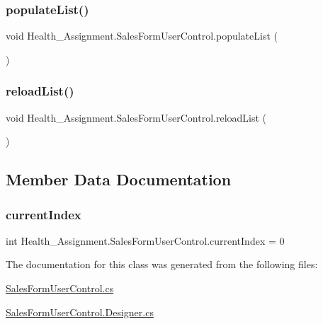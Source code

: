 \subsubsection{\texorpdfstring{populate\+List()}{populateList()}}
{\footnotesize\ttfamily void Health\+\_\+\+Assignment.\+Sales\+Form\+User\+Control.\+populate\+List (\begin{DoxyParamCaption}{ }\end{DoxyParamCaption})\hspace{0.3cm}{\ttfamily [inline]}}

\mbox{\label{class_health___assignment_1_1_sales_form_user_control_ad156be675f6687f6840c56ddd39fe5a1}} 
\subsubsection{\texorpdfstring{reload\+List()}{reloadList()}}
{\footnotesize\ttfamily void Health\+\_\+\+Assignment.\+Sales\+Form\+User\+Control.\+reload\+List (\begin{DoxyParamCaption}{ }\end{DoxyParamCaption})\hspace{0.3cm}{\ttfamily [inline]}}



\subsection{Member Data Documentation}
\mbox{\label{class_health___assignment_1_1_sales_form_user_control_ac49df6be867963d6c5ddd6ebf806a834}} 
\subsubsection{\texorpdfstring{current\+Index}{currentIndex}}
{\footnotesize\ttfamily int Health\+\_\+\+Assignment.\+Sales\+Form\+User\+Control.\+current\+Index = 0}



The documentation for this class was generated from the following files\+:\begin{DoxyCompactItemize}
\item 
\hyperlink{_sales_form_user_control_8cs}{Sales\+Form\+User\+Control.\+cs}\item 
\hyperlink{_sales_form_user_control_8_designer_8cs}{Sales\+Form\+User\+Control.\+Designer.\+cs}\end{DoxyCompactItemize}
